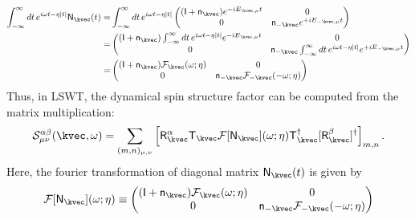\begin{equation}
    \begin{split}
        \int_{-\infty}^{\infty} dt \, e^{i \omega t - \eta |t|} \mathsf{N}_{\kvec} (t) 
        = &
        \int_{-\infty}^{\infty} dt \, e^{i \omega t  - \eta |t|}
        \begin{pmatrix}
            ( \mathsf{I} + \mathsf{n}_{\kvec} ) e^{-{ i E}_{\kvec,\mu}t}  & 0 \\
            0                         & \mathsf{n}_{-\kvec}  e^{+{  i  E}_{-\kvec,\mu}t}
        \end{pmatrix} \\
        = &
        \begin{pmatrix}
            ( \mathsf{I} + \mathsf{n}_{\kvec} ) 
            \int_{-\infty}^{\infty} dt \, e^{i \omega t  - \eta |t|} 
            e^{-{ i E}_{\kvec,\mu}t}  & 0 \\
            0                         & \mathsf{n}_{-\kvec}  
            \int_{-\infty}^{\infty} dt \, e^{i \omega t  - \eta |t|}  e^{+{  i  E}_{-\kvec,\mu}t}
        \end{pmatrix} \\
        = & 
        \begin{pmatrix}
            ( \mathsf{I} + \mathsf{n}_{\kvec} ) \mathcal{F}_{\kvec} (\omega; \eta)  & 0 \\
            0   &   \mathsf{n}_{-\kvec} \mathcal{F}_{- \kvec} (-\omega; \eta)
        \end{pmatrix} 
    \end{split}
\end{equation}
Thus, in LSWT, the dynamical spin structure factor can be computed from the matrix multiplication:
\begin{equation}
    \mathcal{S}^{\alpha\beta}_{\mu\nu} (\kvec, \omega)
    =
    \sum_{(m,n)_{\mu,\nu}} 
    \left[  \mathsf{R}^{\alpha}_{\kvec} \mathsf{T}_{\kvec}
    \mathcal{F} [\mathsf{N}_{\kvec}](\omega; \eta)
    \mathsf{T}_{\kvec}^{\dagger} [\mathsf{R}^{\beta}_{\kvec}]^{\dagger} \right]_{m,n}.
\end{equation}
Here, the fourier transformation of diagonal matrix $\mathsf{N}_{\kvec} (t)$ is given by
\begin{equation}
    \mathcal{F} [\mathsf{N}_{\kvec}](\omega; \eta)
    \equiv 
    \begin{pmatrix}
        ( \mathsf{I} + \mathsf{n}_{\kvec} )    \mathcal{F}_{ \kvec} (  \omega; \eta  )  & 0 \\
        0   &   \mathsf{n}_{-\kvec} \mathcal{F}_{-\kvec} ( -\omega; \eta  )
    \end{pmatrix} 
\end{equation}


